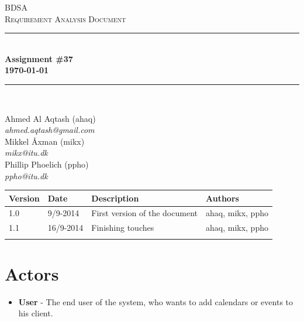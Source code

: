 \documentclass[10pt]{report}
\numberwithin{equation}{section} %
\numberwithin{figure}{section} %
\numberwithin{table}{section} %
\newcommand{\HRule}{\rule{\linewidth}{0.5mm}}
\begin{document}
\begin{titlepage}

\begin{center}

\textsc{\LARGE BDSA}\\[1.5cm]

\textsc{\Large Requirement Analysis Document}\\[0.5cm]

\HRule \\[0.4cm]

{ \bfseries Assignment \#37 \\[0.5cm] 
    {\small \today}} \\[0.7cm]

\HRule \\ [6.5cm]

\begin{minipage}{0.5\textwidth}
\begin{flushleft} \large
Ahmed Al Aqtash (ahaq)\\
\textit{ahmed.aqtash@gmail.com}\\
Mikkel Åxman (mikx)\\
\textit{mikx@itu.dk}\\
Phillip Phoelich (ppho)\\
\textit{ppho@itu.dk}\\

\vfill 
\end{flushleft}
\end{minipage}

\end{center}

\end{titlepage}
\clearpage
\begin{table}[h]
\begin{tabularx}{\textwidth}{l l X l}
\textbf{Version} & \textbf{Date} & \textbf{Description} & \textbf{Authors} \\ \midrule
1.0     & 9/9-2014 & First version of the document & ahaq, mikx, ppho \\
1.1     & 16/9-2014& Finishing touches             & ahaq, mikx, ppho \\
        &          &                               & \\
\end{tabularx}
\end{table}

\clearpage
\section{Actors}
\begin{itemize}
\item \textbf{User} - The end user of the system, who wants to add calendars or
  events to his client.
\end{itemize}
\end{document}
